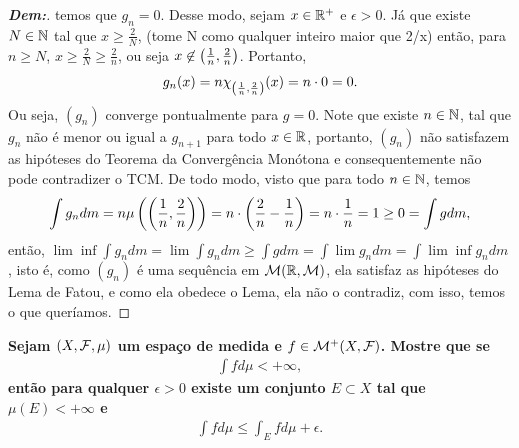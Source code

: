 {\begin{enumerate}[label=\alph*)]
\begin{proof}[\textbf{Dem:}]
      temos que $g_n = 0$. Desse modo, sejam $x \in \mathbb R^+$ e $\epsilon >0$.
      Já que existe $N \in \mathbb N$ tal que $x \ge \frac{2}{N}$,
      (tome N como qualquer inteiro maior que 2/x) então, para $n \ge N$, $x \ge \frac{2}{N} 
      \ge \frac{2}{n}$, ou seja $x \not \in \left(\frac{1}{n}, \frac{2}{n}\right)$. Portanto, 
      \begin{align*}
        g_n(x) = n \chi_{\left(\frac{1}{n}, \frac{2}{n}\right)}(x) = n \cdot 0 = 0.
      \end{align*}
      Ou seja, $(g_n)$ converge pontualmente para $g=0$. Note que existe $n \in \mathbb N$,
      tal que $g_n$ não é menor ou igual a $g_{n+1}$ para todo $x \in \mathbb R$, portanto,
      $(g_n)$ não satisfazem as hipóteses do Teorema 
      da Convergência Monótona e consequentemente não pode 
      contradizer o TCM. De todo modo, visto que para todo $n \in \mathbb N$, temos 
      \begin{align*}
        \int g_n dm = n \mu\left(\left(\frac{1}{n}, \frac{2}{n}\right)\right) = n \cdot \left(\frac{2}{n}
        - \frac{1}{n}\right) = n \cdot \frac{1}{n} = 1 \ge 0 = \int g dm,
      \end{align*}
      então, $\lim\inf \int g_n dm=\lim \int g_n dm \ge \int g dm =  \int \lim g_n dm = 
      \int \lim \inf g_n dm$, isto é, como $(g_n)$ é uma 
      sequência em $\mathcal M (\mathbb R, \mathcal M)$, ela satisfaz as hipóteses do Lema de Fatou,
      e como ela obedece o Lema, ela não o contradiz, com isso, temos o que queríamos.
    \end{proof}
\end{enumerate}
} 
\biglinend 
\newpage
{}
\myexe{\thetres}
\bigline
\textbf{
  Sejam $(X, \mathcal F, \mu)$ um espaço de medida e $f \in \mathcal M^+(X, \mathcal F)$. 
  Mostre que se 
  \begin{align*}
    \int f d\mu < + \infty, 
  \end{align*}
  então para qualquer $\epsilon>0$ existe um conjunto $E \subset X$ tal que 
  $\mu(E)< +\infty$ e 
  \begin{align*}
    \int f d\mu \le \int_E f d\mu + \epsilon.
  \end{align*}
}
